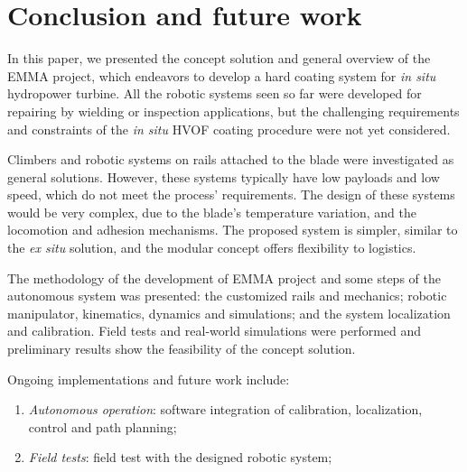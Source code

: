 \section{Conclusion and future work}

In this paper, we presented the concept solution and general overview of the
EMMA project, which endeavors to develop a hard coating system for \textit{in
situ} hydropower turbine. All the robotic systems seen so far were developed for
repairing by wielding or inspection applications, but the challenging
requirements and constraints of the \textit{in situ} HVOF coating procedure
were not yet considered. 

Climbers and robotic systems on rails attached to the blade were investigated as
general solutions. However, these systems typically have low payloads and low
speed, which do not meet the process' requirements. The design of these systems
would be very complex, due to the blade's temperature variation, and the
locomotion and adhesion mechanisms. The proposed system is simpler, similar to
the \textit{ex situ} solution, and the modular concept offers flexibility to
logistics.

The methodology of the development of EMMA project and some steps
of the autonomous system was presented: the customized rails and mechanics;
robotic manipulator, kinematics, dynamics and simulations; and the system
localization and calibration. Field tests and real-world simulations were
performed and preliminary results show the feasibility of the concept solution.

Ongoing implementations and future work include:
\begin{enumerate}
  	\item \textit{Autonomous operation}: software integration of calibration,
  	localization, control and path planning;
  	\item \textit{Field tests}: field test with the designed robotic system;
\end{enumerate}
